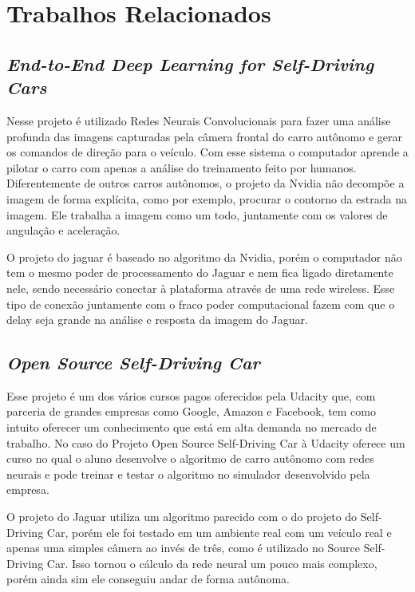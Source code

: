 \chapter{Trabalhos Relacionados}
\label{cap:trabalhos-relacionados}

\section{\textit{End-to-End Deep Learning for Self-Driving Cars}}

Nesse projeto é utilizado Redes Neurais Convolucionais para fazer uma análise profunda das imagens capturadas pela câmera frontal do carro autônomo e gerar os comandos de direção para o veículo. Com esse sistema o computador aprende a pilotar o carro com apenas a análise do treinamento feito por humanos. Diferentemente de outros carros autônomos, o projeto da Nvidia não decompõe a imagem de forma explícita, como por exemplo, procurar o contorno da estrada na imagem. Ele trabalha a imagem como um todo, juntamente com os valores de angulação e aceleração. \cite{nvidiabojarski2016end}

O projeto do jaguar é baseado no algoritmo da Nvidia, porém o computador não tem o mesmo poder de processamento do Jaguar e nem fica ligado diretamente nele, sendo necessário conectar à plataforma através de uma rede wireless. Esse tipo de conexão juntamente com o fraco poder computacional fazem com que o delay seja grande na análise e resposta da imagem do Jaguar.

\section{\textit{Open Source Self-Driving Car}}

Esse projeto é um dos vários cursos pagos oferecidos pela Udacity que, com parceria de grandes empresas como Google, Amazon e Facebook, tem como intuito oferecer um conhecimento que está em alta demanda no mercado de trabalho. No caso do Projeto Open Source Self-Driving Car à Udacity oferece um curso no qual o aluno desenvolve o algoritmo de carro autônomo com redes neurais e pode treinar e testar o algoritmo no simulador desenvolvido pela empresa. \cite{self-drivingcar} 

O projeto do Jaguar utiliza um algoritmo parecido com o do projeto do Self-Driving Car, porém ele foi testado em um ambiente real com um veículo real e apenas uma simples câmera ao invés de três, como é utilizado no Source Self-Driving Car. Isso tornou o cálculo da rede neural um pouco mais complexo, porém ainda sim ele conseguiu andar de forma autônoma.

